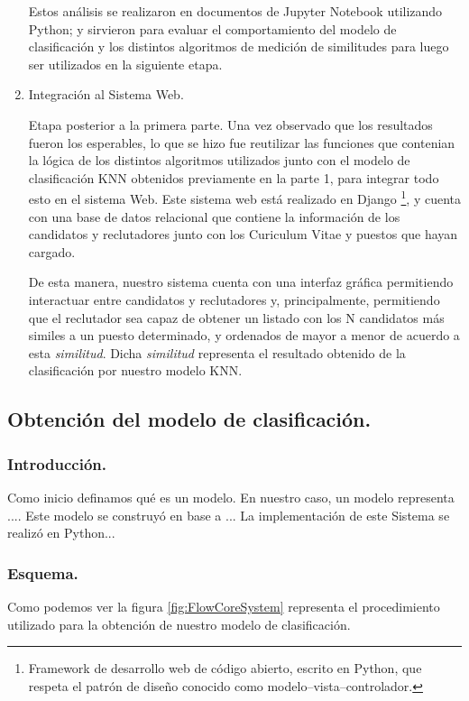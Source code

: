 \documentclass[12pt,a4paper]{article}
\begin{document}
\begin{sloppypar}
\begin{enumerate}
Estos análisis se realizaron en documentos de Jupyter Notebook utilizando Python; y sirvieron para evaluar el comportamiento del modelo de clasificación y los distintos algoritmos de medición de similitudes para luego ser utilizados en la siguiente etapa. \\

\item Integración al Sistema Web. 

Etapa posterior a la primera parte. Una vez observado que los resultados fueron los esperables, lo que se hizo fue reutilizar las funciones que contenian la lógica de los distintos algoritmos utilizados junto con el modelo de clasificación KNN obtenidos previamente en la parte 1, para integrar todo esto en el sistema Web. Este sistema web está realizado en Django \footnote{Framework de desarrollo web de código abierto, escrito en Python, que respeta el patrón de diseño conocido como modelo–vista–controlador.}, y cuenta con una base de datos relacional que contiene la información de los candidatos y reclutadores junto con los Curiculum Vitae y puestos que hayan cargado. 

De esta manera, nuestro sistema cuenta con una interfaz gráfica permitiendo interactuar entre candidatos y reclutadores y, principalmente, permitiendo que el reclutador sea capaz de obtener un listado con los N candidatos más similes a un puesto determinado, y ordenados de mayor a menor de acuerdo a esta \textit{similitud}. Dicha \textit{similitud} representa el resultado obtenido de la clasificación por nuestro modelo KNN.

\end{enumerate}

\cleardoublepage

\subsection{Obtención del modelo de clasificación.}\label{5.1.Obtenciondelmodelopredictivo}

\subsubsection{Introducción.}
Como inicio definamos qué es un modelo. En nuestro caso, un modelo representa ....
Este modelo se construyó en base a ...
La implementación de este Sistema se realizó en Python...

\subsubsection{Esquema.}
Como podemos ver la figura \ref{fig:FlowCoreSystem} representa el procedimiento utilizado para la obtención de nuestro modelo de clasificación. 


\end{sloppypar}
\end{document}
